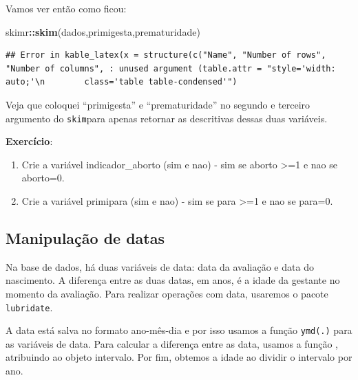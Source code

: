 \documentclass[
]{book}
\newenvironment{Shaded}{\begin{snugshade}}{\end{snugshade}}
\newcommand{\CommentTok}[1]{\textcolor[rgb]{0.56,0.35,0.01}{\textit{#1}}}
\newcommand{\DecValTok}[1]{\textcolor[rgb]{0.00,0.00,0.81}{#1}}
\newcommand{\KeywordTok}[1]{\textcolor[rgb]{0.13,0.29,0.53}{\textbf{#1}}}
\newcommand{\NormalTok}[1]{#1}
\newcommand{\OperatorTok}[1]{\textcolor[rgb]{0.81,0.36,0.00}{\textbf{#1}}}
\newcommand{\StringTok}[1]{\textcolor[rgb]{0.31,0.60,0.02}{#1}}
\begin{document}
Vamos ver então como ficou:

\begin{Shaded}
\begin{Highlighting}[]
\NormalTok{skimr}\OperatorTok{::}\KeywordTok{skim}\NormalTok{(dados,primigesta,prematuridade) }
\end{Highlighting}
\end{Shaded}

\begin{verbatim}
## Error in kable_latex(x = structure(c("Name", "Number of rows", "Number of columns", : unused argument (table.attr = "style='width: auto;'\n        class='table table-condensed'")
\end{verbatim}

Veja que coloquei ``primigesta'' e ``prematuridade'' no segundo e terceiro argumento do \texttt{skim}para apenas retornar as descritivas dessas duas variáveis.

\textbf{Exercício}:

\begin{enumerate}
\def\labelenumi{\arabic{enumi})}
\item
  Crie a variável indicador\_aborto (sim e nao) - sim se aborto \textgreater=1 e nao se aborto=0.
\item
  Crie a variável primipara (sim e nao) - sim se para \textgreater=1 e nao se para=0.
\end{enumerate}

\hypertarget{manipulauxe7uxe3o-de-datas}{%
\subsection{Manipulação de datas}\label{manipulauxe7uxe3o-de-datas}}

Na base de dados, há duas variáveis de data: data da avaliação e data do nascimento. A diferença entre as duas datas, em anos, é a idade da gestante no momento da avaliação. Para realizar operações com data, usaremos o pacote \texttt{lubridate}.

A data está salva no formato ano-mês-dia e por isso usamos a função \texttt{ymd(.)} para as variáveis de data. Para calcular a diferença entre as data, usamos a função \(%
\), atribuindo ao objeto intervalo. Por fim, obtemos a idade ao dividir o intervalo por ano.

\begin{Shaded}
\end{Shaded}
\end{document}
